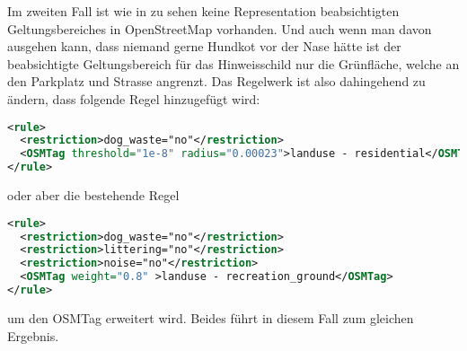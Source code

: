 Im zweiten Fall ist wie in  zu sehen keine Representation
beabsichtigten Geltungsbereiches in OpenStreetMap vorhanden. Und auch wenn man davon
ausgehen kann, dass niemand gerne Hundkot vor der Nase hätte ist der beabsichtigte
Geltungsbereich für das Hinweisschild nur die Grünfläche, welche an den Parkplatz
und Strasse angrenzt.
Das Regelwerk ist also dahingehend zu ändern, dass folgende Regel hinzugefügt wird:
\begin{lstlisting}[language=xml,frame=single]
<rule>
  <restriction>dog_waste="no"</restriction>
  <OSMTag threshold="1e-8" radius="0.00023">landuse - residential</OSMTag>
</rule>
\end{lstlisting}
oder aber die bestehende Regel
\begin{lstlisting}[language=xml,frame=single]
<rule>
  <restriction>dog_waste="no"</restriction>
  <restriction>littering="no"</restriction>
  <restriction>noise="no"</restriction>
  <OSMTag weight="0.8" >landuse - recreation_ground</OSMTag>
</rule>
\end{lstlisting}
um den OSMTag erweitert wird.
Beides führt in diesem Fall zum gleichen Ergebnis.
